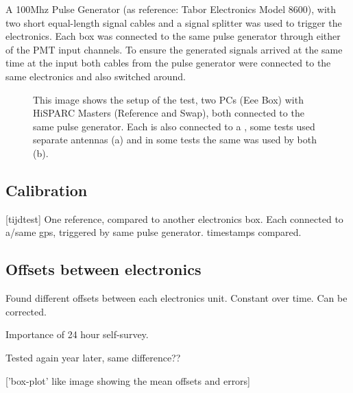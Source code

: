 A 100Mhz Pulse Generator (as reference: Tabor Electronics Model 8600),
with two short equal-length signal cables and a signal splitter was used
to trigger the \hisparc electronics. Each box was connected to the same
pulse generator through either of the PMT input channels. To ensure the
generated signals arrived at the same time at the input both cables from
the pulse generator were connected to the same \hisparc electronics and
also switched around.

\begin{figure}
    \centering
    
    \caption{This image shows the setup of the test, two PCs (Eee Box)
             with HiSPARC Masters (Reference and Swap), both connected
             to the same pulse generator. Each is also connected to a
             \gps, some tests used separate \gps antennas (a) and in
             some tests the same \gps was used by both (b).}
    \label{fig:setup}
\end{figure}


\subsection{Calibration}
\label{sub:gps_calibration}

[tijdtest]
One reference, compared to another \hisparc electronics box.
Each connected to a/same gps, triggered by same pulse generator.
\gps timestamps compared.


\subsection{Offsets between \hisparc electronics}
\label{sub:gps_offsets}

Found different offsets between each \hisparc electronics unit.
Constant over time. Can be corrected.

Importance of 24 hour self-survey.

Tested again year later, same difference??

['box-plot' like image showing the mean offsets and errors]
